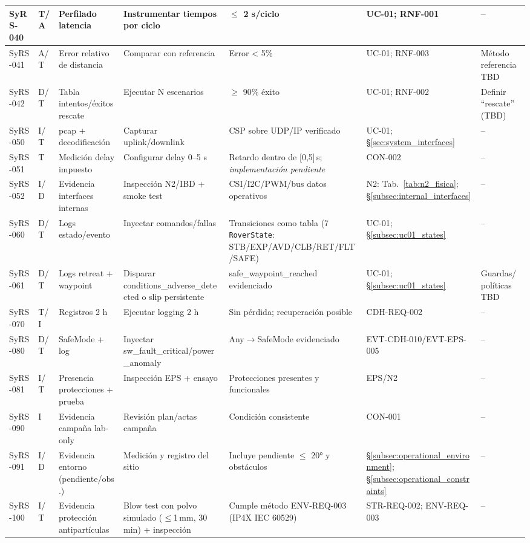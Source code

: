 \begin{landscape}
\begin{longtable}{|p{1.8cm}|p{1.4cm}|p{4.2cm}|p{4.8cm}|p{4.2cm}|p{3.2cm}|p{2.2cm}|}
SyRS-040 & T/A & Perfilado latencia & Instrumentar tiempos por ciclo & $\le$ 2 s/ciclo & UC-01; RNF-001 & --\\ \hline
SyRS-041 & A/T & Error relativo de distancia & Comparar con referencia & Error < 5\% & UC-01; RNF-003 & Método referencia TBD\\ \hline
SyRS-042 & D/T & Tabla intentos/éxitos rescate & Ejecutar N escenarios & $\ge$ 90\% éxito & UC-01; RNF-002 & Definir “rescate” (TBD)\\ \hline
SyRS-050 & I/T & pcap + decodificación & Capturar uplink/downlink & CSP sobre UDP/IP verificado & UC-01; \S\ref{sec:system_interfaces} & --\\ \hline
SyRS-051 & T & Medición delay impuesto & Configurar delay 0--5 s & Retardo dentro de [0,5]\,s; \emph{implementación pendiente} & CON-002 & --\\ \hline
SyRS-052 & I/D & Evidencia interfaces internas & Inspección N2/IBD + smoke test & CSI/I2C/PWM/bus datos operativos & N2: Tab.~\ref{tab:n2_fisica}; \S\ref{subsec:internal_interfaces} & --\\ \hline
SyRS-060 & D/T & Logs estado/evento & Inyectar comandos/fallas & Transiciones como tabla (7 \texttt{RoverState}: STB/EXP/AVD/CLB/RET/FLT/SAFE) & UC-01; \S\ref{subsec:uc01_states} & --\\ \hline
SyRS-061 & D/T & Logs retreat + waypoint & Disparar conditions\_adverse\_detected o slip persistente & safe\_waypoint\_reached evidenciado & UC-01; \S\ref{subsec:uc01_states} & Guardas/políticas TBD\\ \hline
SyRS-070 & T/I & Registros 2 h & Ejecutar logging 2 h & Sin pérdida; recuperación posible & CDH-REQ-002 & --\\ \hline
SyRS-080 & D/T & SafeMode + log & Inyectar sw\_fault\_critical/power\_anomaly & Any$\rightarrow$SafeMode evidenciado & EVT-CDH-010/EVT-EPS-005 & --\\ \hline
SyRS-081 & I/T & Presencia protecciones + prueba & Inspección EPS + ensayo & Protecciones presentes y funcionales & EPS/N2 & --\\ \hline
SyRS-090 & I & Evidencia campaña lab-only & Revisión plan/actas campaña & Condición consistente & CON-001 & --\\ \hline
SyRS-091 & I/D & Evidencia entorno (pendiente/obs.) & Medición y registro del sitio & Incluye pendiente $\le$ 20° y obstáculos & \S\ref{subsec:operational_environment}; \S\ref{subsec:operational_constraints} & --\\ \hline
SyRS-100 & I/T & Evidencia protección antipartículas & Blow test con polvo simulado ($\le$1\,mm, 30\,min) + inspección & Cumple método ENV-REQ-003 (IP4X IEC 60529) & STR-REQ-002; ENV-REQ-003 & --\\ \hline


\end{longtable}
\end{landscape}
